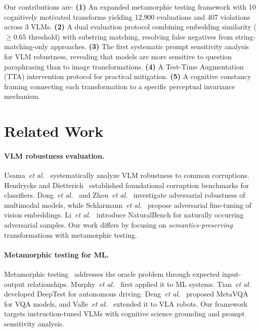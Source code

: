\documentclass{cvpr}
\providecommand{\etal}{\textit{et al.}}
\begin{document}
Our contributions are: \textbf{(1)} An expanded metamorphic testing framework with 10 cognitively motivated transforms yielding 12{,}900 evaluations and 407 violations across 3 VLMs. \textbf{(2)} A dual evaluation protocol combining embedding similarity ($\geq 0.65$ threshold) with substring matching, resolving false negatives from string-matching-only approaches. \textbf{(3)} The first systematic prompt sensitivity analysis for VLM robustness, revealing that models are more sensitive to question paraphrasing than to image transformations. \textbf{(4)} A Test-Time Augmentation (TTA) intervention protocol for practical mitigation. \textbf{(5)} A cognitive constancy framing connecting each transformation to a specific perceptual invariance mechanism.

\section{Related Work}
\label{sec:related}

\paragraph{VLM robustness evaluation.}
Usama~\etal~\cite{usama2025analysing} systematically analyze VLM robustness to common corruptions. Hendrycks and Dietterich~\cite{hendrycks2019benchmarking} established foundational corruption benchmarks for classifiers. Dong~\etal~\cite{dong2023robust} and Zhou~\etal~\cite{zhou2024revisiting} investigate adversarial robustness of multimodal models, while Schlarmann~\etal~\cite{schlarmann2024robust} propose adversarial fine-tuning of vision embeddings. Li~\etal~\cite{li2024naturalbench} introduce NaturalBench for naturally occurring adversarial samples. Our work differs by focusing on \textit{semantics-preserving} transformations with metamorphic testing.

\paragraph{Metamorphic testing for ML.}
Metamorphic testing~\cite{chen2018metamorphic, segura2016survey} addresses the oracle problem through expected input-output relationships. Murphy~\etal~\cite{murphy2008properties} first applied it to ML systems. Tian~\etal~\cite{tian2018deeptest} developed DeepTest for autonomous driving. Deng~\etal~\cite{deng2021perception} proposed MetaVQA for VQA models, and Valle~\etal~\cite{valle2026metamorphic} extended it to VLA robots. Our framework targets instruction-tuned VLMs with cognitive science grounding and prompt sensitivity analysis.
\end{document}
